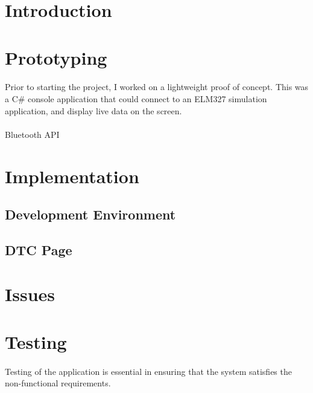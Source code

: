 \section{Introduction}
	\paragraph{}{
	}

\section{Prototyping}
	\paragraph{}{
	Prior to starting the project, I worked on a lightweight proof of concept. This was a C{\#} console application that could connect to an ELM327 simulation application, and display live data on the screen. 
	}
	\paragraph{}{
	Bluetooth API
	}

\section{Implementation}
	\subsection{Development Environment}	
		\paragraph{}{
			
		}
	\subsection{DTC Page}
		\paragraph{}{
		}
		
\section{Issues}
	\paragraph{}{
	}
	
\section{Testing}
	\paragraph{}{
	Testing of the application is essential in ensuring that the system satisfies the non-functional requirements.
	}